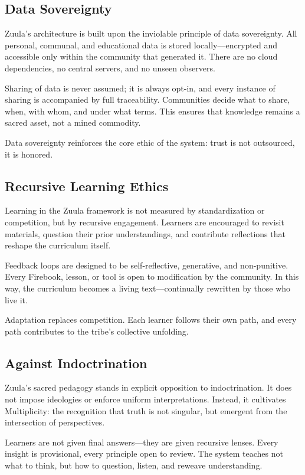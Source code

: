 \documentclass[12pt]{article}
\begin{document}
\subsection*{Data Sovereignty}

Zuula’s architecture is built upon the inviolable principle of data sovereignty. All personal, communal, and educational data is stored locally—encrypted and accessible only within the community that generated it. There are no cloud dependencies, no central servers, and no unseen observers.

Sharing of data is never assumed; it is always opt-in, and every instance of sharing is accompanied by full traceability. Communities decide what to share, when, with whom, and under what terms. This ensures that knowledge remains a sacred asset, not a mined commodity.

Data sovereignty reinforces the core ethic of the system: trust is not outsourced, it is honored.

\subsection*{Recursive Learning Ethics}

Learning in the Zuula framework is not measured by standardization or competition, but by recursive engagement. Learners are encouraged to revisit materials, question their prior understandings, and contribute reflections that reshape the curriculum itself.

Feedback loops are designed to be self-reflective, generative, and non-punitive. Every Firebook, lesson, or tool is open to modification by the community. In this way, the curriculum becomes a living text—continually rewritten by those who live it.

Adaptation replaces competition. Each learner follows their own path, and every path contributes to the tribe’s collective unfolding.

\subsection*{Against Indoctrination}

Zuula’s sacred pedagogy stands in explicit opposition to indoctrination. It does not impose ideologies or enforce uniform interpretations. Instead, it cultivates Multiplicity: the recognition that truth is not singular, but emergent from the intersection of perspectives.

Learners are not given final answers—they are given recursive lenses. Every insight is provisional, every principle open to review. The system teaches not what to think, but how to question, listen, and reweave understanding.
\end{document}
